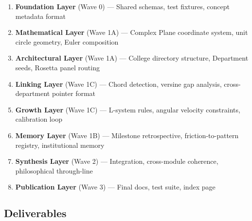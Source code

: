 \documentclass[11pt,letterpaper]{article}
\begin{document}
\begin{enumerate}[noitemsep]
  \item \textbf{Foundation Layer} (Wave 0) — Shared schemas, test fixtures, concept metadata format
  \item \textbf{Mathematical Layer} (Wave 1A) — Complex Plane coordinate system, unit circle geometry, Euler composition
  \item \textbf{Architectural Layer} (Wave 1A) — College directory structure, Department seeds, Rosetta panel routing
  \item \textbf{Linking Layer} (Wave 1C) — Chord detection, versine gap analysis, cross-department pointer format
  \item \textbf{Growth Layer} (Wave 1C) — L-system rules, angular velocity constraints, calibration loop
  \item \textbf{Memory Layer} (Wave 1B) — Milestone retrospective, friction-to-pattern registry, institutional memory
  \item \textbf{Synthesis Layer} (Wave 2) — Integration, cross-module coherence, philosophical through-line
  \item \textbf{Publication Layer} (Wave 3) — Final docs, test suite, index page
\end{enumerate}

\subsection{Deliverables}
\end{document}
